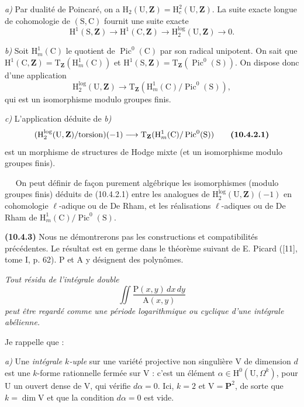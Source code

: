 \documentclass[11pt,leqno]{article}
\newcommand{\Page}[1]{\ifvmode\noindent\else\unskip\ \fi{\footnotesize\textcolor{gray}{[p.\,#1]}}\ \ignorespaces}
\begin{document}
\textit{a)} Par dualité de Poincaré, on a \(\mathrm{H}_{2}(\mathrm{U},\mathbf{Z})=\mathrm{H}^{2}_{c}(\mathrm{U},\mathbf{Z})\). La suite exacte longue de cohomologie de \((\mathrm{S},\mathrm{C})\) fournit une suite exacte
\[
\mathrm{H}^{1}(\mathrm{S},\mathbf{Z})
\longrightarrow\mathrm{H}^{1}(\mathrm{C},\mathbf{Z})
\longrightarrow\mathrm{H}^{\log}_{2}(\mathrm{U},\mathbf{Z})
\longrightarrow0.
\]

\textit{b)} Soit \(\mathrm{H}^{1}_{m}(\mathrm{C})\) le quotient de \(\operatorname{Pic}^{0}(\mathrm{C})\) par son radical unipotent. On sait que \(\mathrm{H}^{1}(\mathrm{C},\mathbf{Z})=\mathrm{T}_{\mathbf{Z}}(\mathrm{H}^{1}_{m}(\mathrm{C}))\) et \(\mathrm{H}^{1}(\mathrm{S},\mathbf{Z})=\mathrm{T}_{\mathbf{Z}}(\operatorname{Pic}^{0}(\mathrm{S}))\). On dispose donc d’une application
\[
\mathrm{H}^{\log}_{2}(\mathrm{U},\mathbf{Z})
\longrightarrow
\mathrm{T}_{\mathbf{Z}}(\mathrm{H}^{1}_{m}(\mathrm{C})/\operatorname{Pic}^{0}(\mathrm{S})),
\]
qui est un isomorphisme modulo groupes finis.

\textit{c)} L’application déduite de \textit{b)}
\[
(\mathrm{H}^{\log}_{2}(\mathrm{U},\mathbf{Z})/\mathrm{torsion})(-1)
\longrightarrow
\mathrm{T}_{\mathbf{Z}}(\mathrm{H}^{1}_{m}(\mathrm{C})/\operatorname{Pic}^{0}(\mathrm{S}))
\tag*{\textbf{(10.4.2.1)}}
\]
est un morphisme de structures de Hodge mixte (et un isomorphisme modulo groupes finis).

\Page{76}
On peut définir de façon purement algébrique les isomorphismes (modulo groupes finis) déduits de (10.4.2.1) entre les analogues de \(\mathrm{H}^{\log}_{2}(\mathrm{U},\mathbf{Z})(-1)\) en cohomologie \(\ell\)-adique ou de De Rham, et les réalisations \(\ell\)-adiques ou de De Rham de \(\mathrm{H}^{1}_{m}(\mathrm{C})/\operatorname{Pic}^{0}(\mathrm{S})\).

\textbf{(10.4.3)} Nous ne démontrerons pas les constructions et compatibilités précédentes. Le résultat est en germe dans le théorème suivant de E. Picard ([11], tome I, p. 62). \(\mathrm{P}\) et \(\mathrm{A}\) y désignent des polynômes.

\textit{Tout résidu de l’intégrale double}
\[
\iint\frac{\mathrm{P}(x,y)\,dx\,dy}{\mathrm{A}(x,y)}
\]
\textit{peut être regardé comme une période logarithmique ou cyclique d’une intégrale abélienne.}

Je rappelle que :

\textit{a)} Une \textit{intégrale \(k\)-uple} sur une variété projective non singulière \(\mathrm{V}\) de dimension \(d\) est une \(k\)-forme rationnelle fermée sur \(\mathrm{V}\) : c’est un élément \(\alpha\in\mathrm{H}^{0}(\mathrm{U},\Omega^{k})\), pour \(\mathrm{U}\) un ouvert dense de \(\mathrm{V}\), qui vérifie \(d\alpha=0\). Ici, \(k=2\) et \(\mathrm{V}=\mathbf{P}^{2}\), de sorte que \(k=\dim\mathrm{V}\) et que la condition \(d\alpha=0\) est vide.
\end{document}
